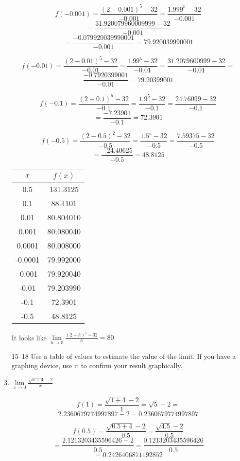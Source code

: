 \documentclass{article}
\begin{document}
\begin{enumerate}
			$$f(-0.001) = \frac{(2 - 0.001)^5 - 32}{-0.001}  =\frac{1.999^5 - 32}{-0.001} $$
			$$= \frac{31.920079960009999 - 32}{-0.001}$$
			$$ = \frac{-0.079920039990001}{-0.001} = 79.920039990001$$
			
			$$f(-0.01) = \frac{(2-0.01)^5 - 32}{-0.01} = \frac{1.99^5 - 32}{-0.01} = \frac{31.2079600999 - 32}{-0.01} = $$
			$$\frac{-0.7920399001}{-0.01} = 79.20399001$$
			
			$$f(-0.1) = \frac{(2- 0.1)^5 - 32}{-0.1} = \frac{1.9^5 - 32}{-0.1} = \frac{24.76099 -32}{-0.1} $$
			$$= \frac{-7.23901}{-0.1} = 72.3901$$
			
			$$f(-0.5) = \frac{(2- 0.5)^2 - 32}{-0.5} = \frac{1.5^5 -32}{-0.5} = \frac{7.59375 - 32}{-0.5} $$
			$$= \frac{-24.40625}{-0.5} = 48.8125$$
			
			\begin{center}
				\begin{tabular}{|c|c|}
				\hline
				$x$ & $f(x)$ \\
				\hline \hline
				0.5 &  131.3125 \\
				0.1 & 88.4101 \\
				0.01 &  80.804010 \\
				0.001 &   80.080040 \\
				0.0001 & 80.008000 \\
				-0.0001 &  79.992000 \\
				-0.001 & 79.920040 \\
				-0.01 & 79.203990 \\
				-0.1 &  72.3901 \\
				-0.5 & 48.8125 \\
				\hline
				\end{tabular}
			\end{center}
			
			It looks like $\lim \limits _{h \to 0} \frac{(2 + h)^5 - 32}{h} = 80$
			
			\item[15--18] Use a table of values to estimate the value of the limit. If you have a graphing
				device, use it to confirm your result graphically.
				
			\item $\lim \limits _{x \to 0} \frac{\sqrt{x + 4} - 2}{x}$
			
				$$f(1) = \frac{\sqrt{1 + 4} - 2}{1} = \sqrt{5} - 2 = $$
				$$2.2360679774997897 - 2 = 0.2360679774997897$$
				
				$$f(0.5) = \frac{\sqrt{0.5 + 4} - 2}{0.5} =\frac{\sqrt{4.5} - 2}{0.5}$$
				$$= \frac{2.1213203435596426 - 2}{0.5} = \frac{0.1213203435596426}{0.5}$$
				$$ = 0.2426406871192852$$
				

\end{enumerate}
\end{document}
